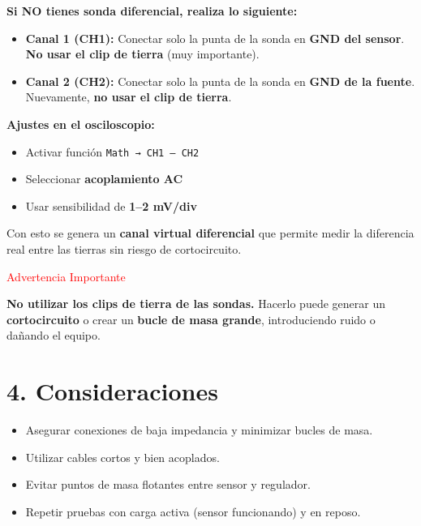\documentclass[12pt]{article}
\begin{document}
\begin{tcolorbox}[colback=gray!10,colframe=black,title={Medición sin Sonda Diferencial (Método con dos canales)}]
	
	\textbf{Si NO tienes sonda diferencial, realiza lo siguiente:}
	
	\begin{itemize}
		\item \textbf{Canal 1 (CH1):}  
		Conectar solo la punta de la sonda en \textbf{GND del sensor}.  
		\textbf{No usar el clip de tierra} (muy importante).
		
		\item \textbf{Canal 2 (CH2):}  
		Conectar solo la punta de la sonda en \textbf{GND de la fuente}.  
		Nuevamente, \textbf{no usar el clip de tierra}.
	\end{itemize}
	
	\textbf{Ajustes en el osciloscopio:}
	
	\begin{itemize}
		\item Activar función \texttt{Math → CH1 – CH2}
		\item Seleccionar \textbf{acoplamiento AC}
		\item Usar sensibilidad de \textbf{1–2 mV/div}
	\end{itemize}
	
	Con esto se genera un \textbf{canal virtual diferencial} que permite medir la diferencia real entre las tierras sin riesgo de cortocircuito.
	
	\begin{center}
		\textcolor{yellow}{}  \textcolor{red}{\large Advertencia Importante}
	\end{center}
	
	\textbf{No utilizar los clips de tierra de las sondas.}  
	Hacerlo puede generar un \textbf{cortocircuito} o crear un \textbf{bucle de masa grande}, introduciendo ruido o dañando el equipo.
	
\end{tcolorbox}
	
	\section*{4. Consideraciones}
	\begin{itemize}
		\item Asegurar conexiones de baja impedancia y minimizar bucles de masa.
		\item Utilizar cables cortos y bien acoplados.
		\item Evitar puntos de masa flotantes entre sensor y regulador.
		\item Repetir pruebas con carga activa (sensor funcionando) y en reposo.
	\end{itemize}
	
\end{document}
